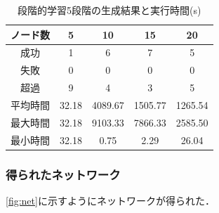 \documentclass[exploratorypaper]{jsaiart} %
\begin{document}
\begin{table}[t]
\caption{段階的学習5段階の生成結果と実行時間(s)}
\label{tbl:result3}
\begin{tabular}{c|cccc}
    ノード数&	5&	10&	15&	20\\
    \hline
    成功&	1&	6&	7&	5\\
    失敗&	0&	0&	0&	0\\
    超過&	9&	4&	3&	5\\
    \hline \hline
    平均時間&	32.18&	4089.67&	1505.77&	1265.54\\
    最大時間&	32.18&	9103.33&	7866.33&	2585.50\\
    最小時間&	32.18&	0.75&	2.29&	26.04\\
    \hline
\end{tabular}
\end{table}


\subsubsection{得られたネットワーク}
\ref{fig:net}に示すようにネットワークが得られた．

\end{document}
